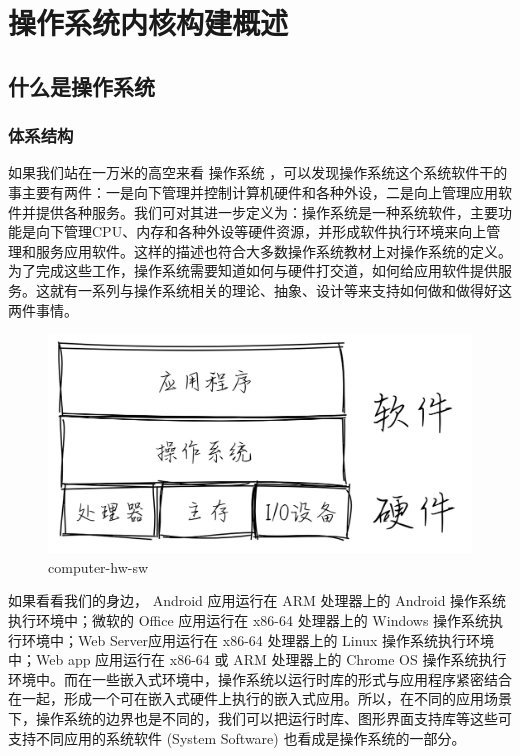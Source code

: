 \chapter{操作系统内核构建概述}
\section{什么是操作系统}
\subsection{体系结构}
如果我们站在一万米的高空来看 操作系统 ，可以发现操作系统这个系统软件干的事主要有两件：一是向下管理并控制计算机硬件和各种外设，二是向上管理应用软件并提供各种服务。我们可对其进一步定义为：操作系统是一种系统软件，主要功能是向下管理CPU、内存和各种外设等硬件资源，并形成软件执行环境来向上管理和服务应用软件。这样的描述也符合大多数操作系统教材上对操作系统的定义。为了完成这些工作，操作系统需要知道如何与硬件打交道，如何给应用软件提供服务。这就有一系列与操作系统相关的理论、抽象、设计等来支持如何做和做得好这两件事情。
\begin{figure}[htb]
	\centering
	\includegraphics[width=\textwidth]{figures/01-01-computer-hw-sw.png}
	\caption{
		computer-hw-sw
	}
	\label{fig:computer-hw-sw}
\end{figure}
如果看看我们的身边， Android 应用运行在 ARM 处理器上的 Android 操作系统执行环境中；微软的 Office 应用运行在 x86-64 处理器上的 Windows 操作系统执行环境中；Web Server应用运行在 x86-64 处理器上的 Linux 操作系统执行环境中；Web app 应用运行在 x86-64 或 ARM 处理器上的 Chrome OS 操作系统执行环境中。而在一些嵌入式环境中，操作系统以运行时库的形式与应用程序紧密结合在一起，形成一个可在嵌入式硬件上执行的嵌入式应用。所以，在不同的应用场景下，操作系统的边界也是不同的，我们可以把运行时库、图形界面支持库等这些可支持不同应用的系统软件 (System Software) 也看成是操作系统的一部分。

